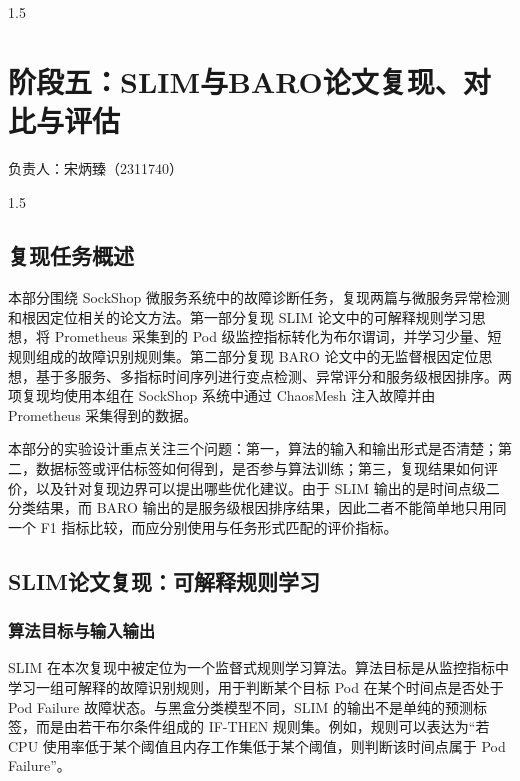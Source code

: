 \documentclass[a4paper,12pt]{report}
\begin{document}
\begin{spacing}{1.5}
\end{spacing}

\chapter*{阶段五：SLIM与BARO论文复现、对比与评估}
\vspace{-0.5em}
\begin{flushright}
{\kaishu{} 负责人：宋炳臻（2311740）}
\end{flushright}

\begin{spacing}{1.5}
\songti{}

\section{复现任务概述}

本部分围绕 SockShop 微服务系统中的故障诊断任务，复现两篇与微服务异常检测和根因定位相关的论文方法。第一部分复现 SLIM 论文中的可解释规则学习思想，将 Prometheus 采集到的 Pod 级监控指标转化为布尔谓词，并学习少量、短规则组成的故障识别规则集\cite{slim2024}。第二部分复现 BARO 论文中的无监督根因定位思想，基于多服务、多指标时间序列进行变点检测、异常评分和服务级根因排序\cite{baro2024}。两项复现均使用本组在 SockShop 系统中通过 ChaosMesh 注入故障并由 Prometheus 采集得到的数据。

本部分的实验设计重点关注三个问题：第一，算法的输入和输出形式是否清楚；第二，数据标签或评估标签如何得到，是否参与算法训练；第三，复现结果如何评价，以及针对复现边界可以提出哪些优化建议。由于 SLIM 输出的是时间点级二分类结果，而 BARO 输出的是服务级根因排序结果，因此二者不能简单地只用同一个 F1 指标比较，而应分别使用与任务形式匹配的评价指标。

\section{SLIM论文复现：可解释规则学习}

\subsection{算法目标与输入输出}

SLIM 在本次复现中被定位为一个监督式规则学习算法\cite{slim2024}。算法目标是从监控指标中学习一组可解释的故障识别规则，用于判断某个目标 Pod 在某个时间点是否处于 Pod Failure 故障状态。与黑盒分类模型不同，SLIM 的输出不是单纯的预测标签，而是由若干布尔条件组成的 IF-THEN 规则集。例如，规则可以表达为“若 CPU 使用率低于某个阈值且内存工作集低于某个阈值，则判断该时间点属于 Pod Failure”。


\end{spacing}
\end{document}
